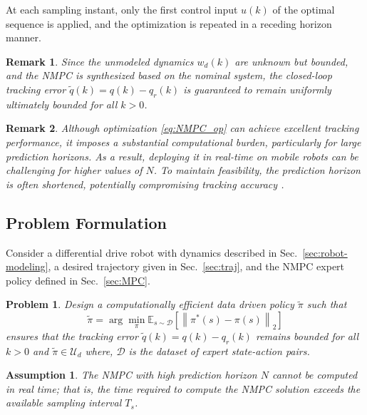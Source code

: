 \documentclass[letterpaper, 10 pt, conference]{ieeeconf}
\newtheorem{assumption}{Assumption}
\newtheorem{problem}{Problem}
\newtheorem{remark}{\textbf{Remark}}
\begin{document}
At each sampling instant, only the first control input \(u(k)\) of the optimal sequence is applied, and the optimization is repeated in a receding horizon manner.

\begin{remark}
  Since the unmodeled dynamics $w_d(k)$ are unknown but bounded, and the NMPC is synthesized based on the nominal system, the closed-loop tracking error $\tilde{q}(k) = q(k) - q_r(k)$ is guaranteed to remain uniformly ultimately bounded for all $k > 0$.
\end{remark}

\begin{remark}
  Although optimization \eqref{eq:NMPC_op} can achieve excellent tracking performance, it imposes a substantial computational burden, particularly for large prediction horizons. As a result, deploying it in real-time on mobile robots can be challenging for higher values of $N$. To maintain feasibility, the prediction horizon is often shortened, potentially compromising tracking accuracy \cite{NMPC_compuational}.
\end{remark}

\subsection{Problem Formulation}
Consider a differential drive robot with dynamics described in Sec.~\ref{sec:robot-modeling}, a desired trajectory given in Sec.~\ref{sec:traj}, and the NMPC  expert policy defined in Sec.~\ref{sec:MPC}.

\begin{problem}
  Design a computationally efficient data driven policy $\tilde{\pi}$ such that
  \begin{equation}
    \tilde{\pi} = \arg\min_{\pi} \mathbb{E}_{s \sim \mathcal{D} } \left[  \left\lVert \pi^*(s)- \pi(s) \right\rVert_2 \right]
  \end{equation}
  ensures that the tracking error $\tilde{q}(k) = q(k) - q_r(k)$ remains bounded for all $k > 0$ and $\tilde{\pi}\in \mathcal{U}_d$
  where, $\mathcal{D}$ is the dataset of expert state-action pairs.
\end{problem}

\begin{assumption}
  The NMPC with high prediction horizon $N$ cannot be computed in real time; that is, the time required to compute the NMPC solution exceeds the available sampling interval $T_s$.
\end{assumption}
\end{document}
